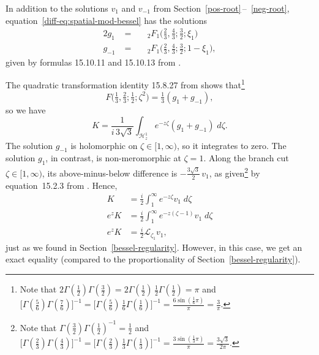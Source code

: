 \documentclass{article}
\newcommand{\laplace}{\mathcal{L}}
\theoremstyle{definition}
\theoremstyle{plain}
\begin{document}
{In addition to the solutions $v_1$ and $v_{-1}$ from Section~\ref{pos-root}\,--\, \ref{neg-root}, equation~\eqref{diff-eq:spatial-mod-bessel} has the solutions
\begin{alignat*}{2}
g_1 &\;=\;& & {}_2F_1\big(\tfrac{2}{3}, \tfrac{4}{3}; \tfrac{3}{2}; \xi_1\big) \\
g_{-1} &\;=\;&  & {}_2F_1\big(\tfrac{2}{3}, \tfrac{4}{3}; \tfrac{3}{2}; 1-\xi_1\big),
\end{alignat*}
given by formulas 15.10.11 and 15.10.13 from \cite{dlmf}.

The quadratic transformation identity 15.8.27 from \cite{dlmf} shows that\footnote{Note that $2\Gamma(\tfrac{1}{2})\Gamma(\tfrac{3}{2}) = 2\Gamma(\tfrac{1}{2})\,\tfrac{1}{2}\Gamma(\tfrac{1}{2}) = \pi$ and $\big[\Gamma(\tfrac{5}{6})\Gamma(\tfrac{7}{6})\big]^{-1} = \big[\Gamma(\tfrac{5}{6})\,\tfrac{1}{6}\Gamma(\tfrac{1}{6})\big]^{-1} = \frac{6\sin(\tfrac{1}{6} \pi)}{\pi} = \frac{3}{\pi}$.}
\[ F\big(\tfrac{1}{3}, \tfrac{2}{3}; \tfrac{1}{2}; \zeta^2\big) = \tfrac{1}{3}(g_1 + g_{-1}), \]
so we have
\[ K = \frac{1}{i\,3\sqrt{3}} \int_{\mathcal{H}^1_z} e^{-z\zeta} (g_1 + g_{-1})\;d\zeta. \]
The solution $g_{-1}$ is holomorphic on $\zeta \in [1, \infty)$, so it integrates to zero. The solution $g_1$, in contrast, is non-meromorphic at $\zeta = 1$. Along the branch cut $\zeta \in [1, \infty)$, its above-minus-below difference is $-\tfrac{3\sqrt{3}}{2}\,v_1$,
as given\footnote{Note that $\Gamma(\tfrac{3}{2}) \Gamma(\tfrac{1}{2})^{-1} = \tfrac{1}{2}$ and $\big[\Gamma(\tfrac{2}{3})\Gamma(\tfrac{4}{3})\big]^{-1} = \big[\Gamma(\tfrac{2}{3})\,\tfrac{1}{3}\Gamma(\tfrac{1}{3})\big]^{-1} = \frac{3\sin(\tfrac{1}{3} \pi)}{\pi} = \frac{3\sqrt{3}}{2\pi}$.} by equation~15.2.3 from \cite{dlmf}.
Hence,
\begin{align*}
K & = \frac{i}{2} \int^\infty_1 e^{-z\zeta} v_1\;d\zeta \\
e^z K & = \frac{i}{2} \int^\infty_1 e^{-z(\zeta - 1)} v_1\;d\zeta \\
e^z K & = \tfrac{i}{2} \laplace_{\zeta_1} v_1,
\end{align*}
just as we found in Section~\ref{bessel-regularity}. However, in this case, we get an exact equality (compared to the proportionality of Section~\ref{bessel-regularity}). 
}
\end{document}
